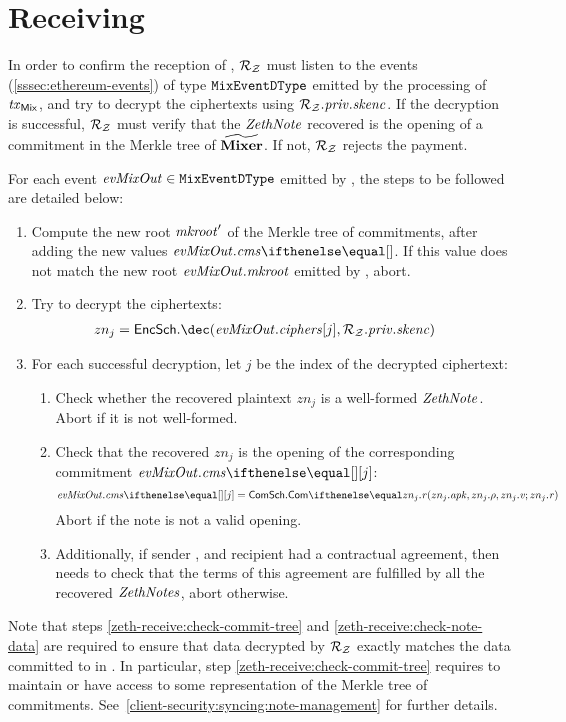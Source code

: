 
\section{Receiving \zethnotes}\label{zeth-protocol:zeth-receive}

In order to confirm the reception of \zethnotes, $\mathcal{{R}_{Z}}$ must listen to the events (\cref{sssec:ethereum-events}) of type ${\mathtt{MixEventDType}}$ emitted by the processing of $\mathit{\mathit{tx}_{\mathsf{Mix}}}$, and try to decrypt the ciphertexts using $\mathcal{{R}_{Z}}.\mathit{priv}.\mathit{skenc}$. If the decryption is successful, $\mathcal{{R}_{Z}}$ must verify that the $\mathit{ZethNote}$ recovered is the opening of a commitment in the Merkle tree of $\widetilde{\mathbf{Mixer}}$. If not, $\mathcal{{R}_{Z}}$ rejects the payment.

For each event $\mathit{evMixOut}{} \in {\mathtt{MixEventDType}}$ emitted by \mixer{}, the steps to be followed are detailed below:

\begin{enumerate}
    \item\label{zeth-receive:check-commit-tree} Compute the new root $\mathit{mkroot}'$ of the Merkle tree of commitments, after adding the new values $\evMixOut.\cms{}$. If this value does not match the new root $\mathit{evMixOut}.\mathit{mkroot}$ emitted by \mixer{}, abort.
    \item\label{zeth-receive:decrypt} Try to decrypt the ciphertexts:
        \begin{align*}
            & zn_j = \encscheme.\dec(\evMixOut.\ciphers[j], \zparty{R}.\privaddr.\skenc)
        \end{align*}
    \item For each successful decryption, let $j$ be the index of the decrypted ciphertext:
        \begin{enumerate}
            \item\label{zeth-receive:parse-plaintext} Check whether the recovered plaintext $zn_j$ is a well-formed $\mathit{ZethNote}$. Abort if it is not well-formed.
            \item\label{zeth-receive:check-note-data} Check that the recovered \zethnote $zn_j$ is the opening of the corresponding commitment $\evMixOut{}.\cms{}[j]$:
                \[
                    \evMixOut.\cms{}[j] = \comm.\commit{zn_j.\apk, zn_j.\rrho, zn_j.\notev}{zn_j.\noter}
                \]
              Abort if the note is not a valid opening.
            \item Additionally, if sender , and recipient  had a contractual agreement, then  needs to check that the terms of this agreement are fulfilled by all the recovered $\mathit{ZethNotes}$, abort otherwise.
        \end{enumerate}
\end{enumerate}

Note that steps \ref{zeth-receive:check-commit-tree} and \ref{zeth-receive:check-note-data} are required to ensure that data decrypted by $\mathcal{{R}_{Z}}$ exactly matches the data committed to in \mixer{}. In particular, step \ref{zeth-receive:check-commit-tree} requires  to maintain or have access to some representation of the Merkle tree of commitments. See~\cref{client-security:syncing:note-management} for further details.
